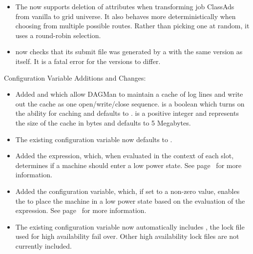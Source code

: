 \begin{itemize}
\item The  now supports deletion of attributes
  when transforming job ClassAds from vanilla to grid universe.  It also
  behaves more deterministically when choosing from multiple possible
  routes.  Rather than picking one at random, it uses a round-robin
  selection.

\item {} now checks that its submit file was generated by
a  with the same version as  itself.
It is a fatal error for the versions to differ.

\end{itemize}

\noindent Configuration Variable Additions and Changes:

\begin{itemize}

\item Added  and 
   which allow DAGMan to maintain a
  cache of log lines and write out the cache as one open/write/close
  sequence.   is a boolean
  which turns on the ability for caching and defaults to .
   is a positive integer and represents
  the size of the cache in bytes and defaults to 5 Megabytes.

\item The existing  configuration variable
  now defaults to .

\item Added the  expression, which, when evaluated in
  the context of each slot, determines if a machine should enter
  a low power state. See page~\pageref{param:Hibernate} for more 
  information.

\item Added the  configuration variable,
  which, if set to a non-zero value, enables the  to place the 
  machine in a low power state based on the evaluation of the
   expression.  See 
  page~\pageref{param:HibernateCheckInterval} for more information.

\item The existing  configuration variable
  now automatically includes ,
  the lock file used for high availability  fail over.
  Other high availability lock files are not currently included.


\end{itemize}
